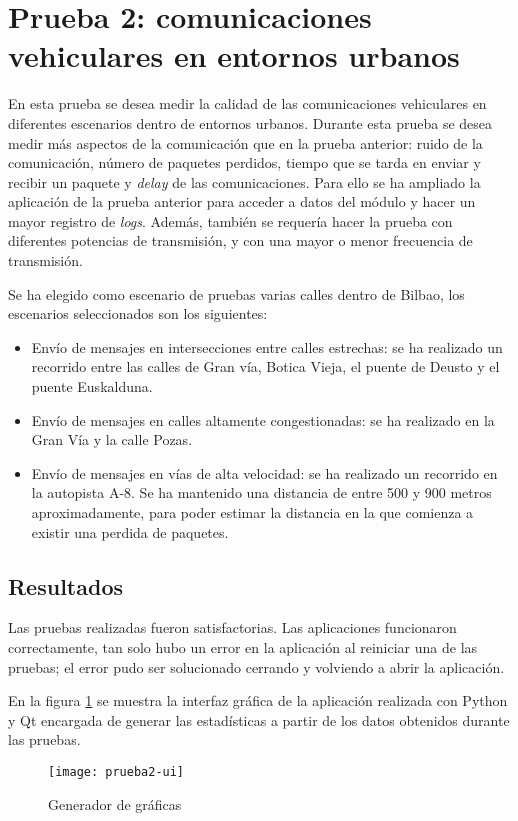 \section{Prueba 2: comunicaciones vehiculares en entornos urbanos}
En esta prueba se desea medir la calidad de las comunicaciones vehiculares en diferentes escenarios dentro de entornos urbanos. Durante esta prueba se desea medir más aspectos de la comunicación que en la prueba anterior: ruido de la comunicación, número de paquetes perdidos, tiempo que se tarda en enviar y recibir un paquete y \emph{delay} de las comunicaciones. Para ello se ha ampliado la aplicación de la prueba anterior para acceder a datos del módulo y hacer un mayor registro de \emph{logs}. Además, también se requería hacer la prueba con diferentes potencias de transmisión, y con una mayor o menor frecuencia de transmisión.

Se ha elegido como escenario de pruebas varias calles dentro de Bilbao, los escenarios seleccionados son los siguientes:
\begin{itemize}
	\item Envío de mensajes en intersecciones entre calles estrechas: se ha	realizado un recorrido entre las calles de Gran vía, Botica Vieja, el puente de Deusto y el puente Euskalduna.
	\item Envío de mensajes en calles altamente congestionadas: se ha realizado	en la Gran Vía y la calle Pozas.
	\item Envío de mensajes en vías de alta velocidad: se ha realizado un recorrido en la	autopista A-8. Se ha mantenido una distancia de entre 500 y 900 metros aproximadamente, para poder estimar la distancia en la que comienza a existir una perdida de paquetes.
\end{itemize}

\subsection{Resultados}
Las pruebas realizadas fueron satisfactorias. Las aplicaciones funcionaron correctamente, tan solo hubo un error en la aplicación al reiniciar una de las pruebas; el error pudo ser solucionado cerrando y volviendo a abrir la aplicación.

En la figura \ref{fig:prueba2-ui} se muestra la interfaz gráfica de la aplicación realizada con Python y Qt encargada de generar las estadísticas a partir de los datos obtenidos durante las pruebas.

\begin{figure}[H]
	\begin{center}
		\texttt{[image: prueba2-ui]}
		\caption{Generador de gráficas}
		\label{fig:prueba2-ui}
	\end{center}
\end{figure}